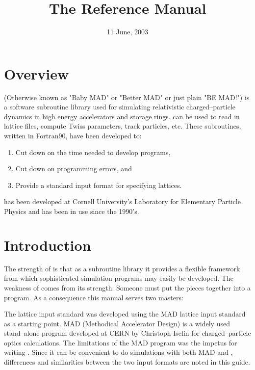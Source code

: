 \documentclass{book}
\begin{document}
\title{The \bmad Reference Manual}

\date{11 June, 2003}
\maketitle

\section*{Overview}

\bmad (Otherwise known as "Baby MAD" or "Better MAD" or just plain "BE MAD!")
is a software subroutine library used for simulating 
relativistic charged--particle dynamics in high energy accelerators
and storage rings. \bmad can be used to read in lattice files, compute 
Twiss parameters, track particles, etc. 
These subroutines, written in  Fortran90, have been developed to:
\begin{enumerate}
\item Cut down on the time needed to develop programs,
\item Cut down on programming errors, and
\item Provide a standard input format for specifying lattices.
\end{enumerate}
\bmad has been developed at Cornell University's Laboratory for Elementary
Particle Physics and has been in use since the 1990's.
\vfill
\break
\section*{Introduction}

The strength of \bmad is that as a subroutine library it provides a flexible
framework from which sophisticated simulation programs may easily be developed.
The weakness of \bmad comes from its strength: Someone must put the pieces 
together into a program. As a consequence this manual serves two masters:

The \bmad lattice input standard was developed using the MAD lattice
input standard as a starting point. MAD (Methodical Accelerator
Design) is a widely used stand--alone program developed at CERN by
Christoph Iselin for charged--particle optics calculations. The
limitations of the MAD program was the impetus for writing
\bmad. Since it can be convenient to do simulations with both MAD and
\bmad, differences and similarities between the two input formats are
noted in this guide.
\end{document}
